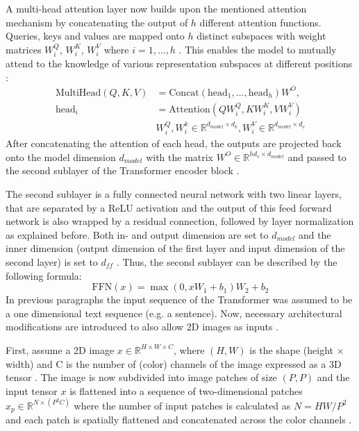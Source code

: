 A multi-head attention layer now builds upon the mentioned attention mechanism by concatenating the output of $h$ different attention functions.
Queries, keys and values are mapped onto $h$ distinct subspaces with weight matrices $W_i^Q$, $W_i^K$, $W_i^V$ where $i=1,\dots,h$ \citep{Vaswani2017}.
This enables the model to mutually attend to the knowledge of various representation subspaces at different positions \citep{Vaswani2017}:
\begin{align}
	\text{MultiHead}(Q,K,V) &= \text{Concat}(\text{head}_1,\dots,\text{head}_h)W^O, \\
	\text{head}_i & = \text{Attention}(QW_i^Q,KW_i^K,VW_i^V) \\
	& W_{i}^{Q}, W_{i}^{k} \in \mathbb{R}^{d_{model}\times d_k} , W_i^V \in \mathbb{R}^{d_{model} \times d_v}	
\end{align}
After concatenating the attention of each head, the outputs are projected back onto the model dimension $d_{model}$ with the matrix $W^O \in \mathbb{R}^{hd_v \times d_{model}}$ and passed to the second sublayer of the Transformer encoder block \citep{Vaswani2017}.
\par
The second sublayer is a fully connected neural network with two linear layers, that are separated by a ReLU activation \citep{Vaswani2017} and the output of this feed forward network is also wrapped by a residual connection, followed by layer normalization as explained before.
Both in- and output dimension are set to $d_{model}$ and the inner dimension (output dimension of the first layer and input dimension of the second layer) is set to $d_{ff}$ \citep{Vaswani2017}.
Thus, the second sublayer can be described by the following formula:
\begin{equation}
	\text{FFN}(x) = \max(0, xW_1 + b_1)W_2+b_2 
	\label{equation:FFN}
\end{equation}
In previous paragraphs the input sequence of the Transformer was assumed to be a one dimensional text sequence (e.g. a sentence).
Now, necessary architectural modifications are introduced to also allow 2D images as inputs \citep{Dosovitskiy2020}.
\par
First, assume a 2D image $x\in \mathbb{R}^{H\times W \times C }$, where $(H, W)$ is the shape (height $\times$ width) and C is the number of (color) channels of the image expressed as a 3D tensor \citep{Dosovitskiy2020}.
The image is now subdivided into image patches of size $(P, P)$ and the input tensor $x$ is flattened into a sequence of two-dimensional patches $x_p \in \mathbb{R}^{N \times (P^2C)}$ where the number of input patches is calculated as $N = HW/P^2$ and each patch is spatially flattened and concatenated across the color channels \citep{Dosovitskiy2020}.
